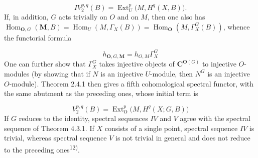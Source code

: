 \begin{equation}
IV_2^{p,q}(B)=\operatorname{Ext}_U^p\bigl(M,H^q(X,B)\bigr).
\tag{5.6.11 bis}
\end{equation}
If, in addition, $G$ acts trivially on $O$ and on $M$, then one also has
$\operatorname{Hom}_{{\mathbf O},G}({\mathbf M},B)=\operatorname{Hom}_U(M,\Gamma_X(B))=\operatorname{Hom}_{{\mathbf O}}(M,\Gamma_X^G(B))$,
whence the functorial formula

\begin{equation}
h_{{\mathbf O},G,{\mathbf M}}=h_{O,M}\Gamma_X^G
\tag{5.6.5 ter}
\end{equation}
One can further show that $\Gamma_X^G$ takes injective objects of ${\mathbf C}^{{\mathbf O}(G)}$
to injective $O$-modules (by showing that if $N$ is an injective $U$-module,
then $N^G$ is an injective $O$-module). Theorem 2.4.1 then gives a fifth
cohomological spectral functor, with the same abutment as the preceding ones,
whose initial term is

\begin{equation}
V_2^{p,q}(B)=\operatorname{Ext}_{\mathrm O}^p\bigl(M,H^q(X;G,B)\bigr)
\tag{5.6.11 ter}
\end{equation}
If $G$ reduces to the identity, spectral sequences $IV$ and $V$ agree with the
spectral sequence of Theorem 4.3.1. If $X$ consists of a single point,
spectral sequence $IV$ is trivial, whereas spectral sequence $V$ is not trivial
in general and does not reduce to the preceding ones\textsuperscript{12)}.

